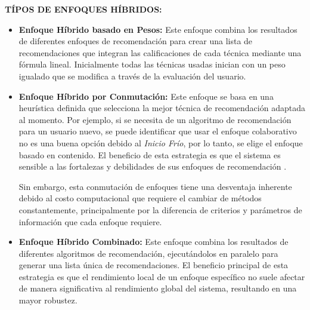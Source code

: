 \textbf{TÍPOS DE ENFOQUES HÍBRIDOS: }
\begin{itemize}
    \item \textbf{Enfoque Híbrido basado en Pesos: } Este enfoque combina los resultados de diferentes enfoques de recomendación para crear una lista de recomendaciones que integran las calificaciones de cada técnica mediante una fórmula lineal. Inicialmente todas las técnicas usadas inician con un peso igualado que se modifica a través de la evaluación del usuario.
    \item \textbf{Enfoque Híbrido por Conmutación: } Este enfoque se basa en una heurística definida que selecciona la mejor técnica de recomendación adaptada al momento. Por ejemplo, si se necesita de un algoritmo de recomendación para un usuario nuevo, se puede identificar que usar el enfoque colaborativo no es una buena opción debido al \textit{Inicio Frío}, por lo tanto, se elige el enfoque basado en contenido. El beneficio de esta estrategia es que el sistema es sensible a las fortalezas y debilidades de sus enfoques de recomendación \parencite{ISINKAYE2015261}. 

    Sin embargo, esta conmutación de enfoques tiene una desventaja inherente debido al costo computacional que requiere el cambiar de métodos constantemente, principalmente por la diferencia de criterios y parámetros de información que cada enfoque requiere.

    \item \textbf{Enfoque Híbrido Combinado: } Este enfoque combina los resultados de diferentes algoritmos de recomendación, ejecutándolos en paralelo para generar una lista única de recomendaciones. El beneficio principal de esta estrategia es que el rendimiento local de un enfoque específico no suele afectar de manera significativa al rendimiento global del sistema, resultando en una mayor robustez.
    
\end{itemize}